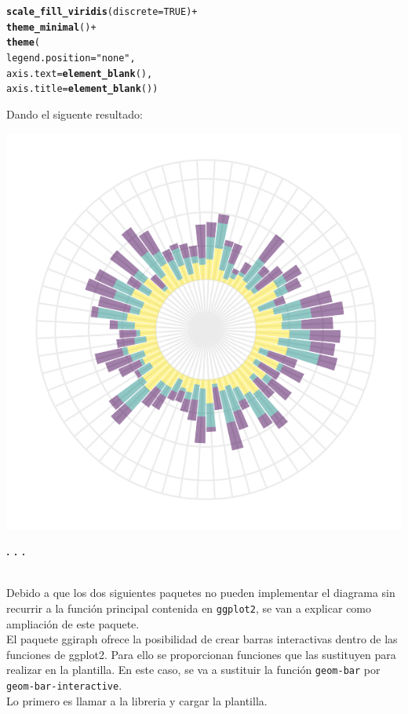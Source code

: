 \documentclass{article}\usepackage[]{graphicx}\usepackage[]{color}
\makeatletter
\def\maxwidth{ %
  \ifdim\Gin@nat@width>\linewidth
    \linewidth
  \else
    \Gin@nat@width
  \fi
}
\newcommand{\hlnum}[1]{\textcolor[rgb]{0.686,0.059,0.569}{#1}}%
\newcommand{\hlstr}[1]{\textcolor[rgb]{0.192,0.494,0.8}{#1}}%
\newcommand{\hlopt}[1]{\textcolor[rgb]{0,0,0}{#1}}%
\newcommand{\hlstd}[1]{\textcolor[rgb]{0.345,0.345,0.345}{#1}}%
\newcommand{\hlkwc}[1]{\textcolor[rgb]{0.333,0.667,0.333}{#1}}%
\newcommand{\hlkwd}[1]{\textcolor[rgb]{0.737,0.353,0.396}{\textbf{#1}}}%
\newenvironment{kframe}{%
 \def\at@end@of@kframe{}%
 \ifinner\ifhmode%
  \def\at@end@of@kframe{\end{minipage}}%
  \begin{minipage}{\columnwidth}%
 \fi\fi%
 \def\FrameCommand##1{\hskip\@totalleftmargin \hskip-\fboxsep
 \colorbox{shadecolor}{##1}\hskip-\fboxsep
     \hskip-\linewidth \hskip-\@totalleftmargin \hskip\columnwidth}%
 \MakeFramed {\advance\hsize-\width
   \@totalleftmargin\z@ \linewidth\hsize
   \@setminipage}}%
 {\par\unskip\endMakeFramed%
 \at@end@of@kframe}
\newenvironment{knitrout}{}{} %
\makeatother
\begin{document}
\begin{knitrout}
\color{fgcolor}\begin{kframe}
\begin{alltt}
  \hlkwd{scale_fill_viridis}\hlstd{(}\hlkwc{discrete}\hlstd{=}\hlnum{TRUE}\hlstd{)} \hlopt{+}
  \hlkwd{theme_minimal}\hlstd{()} \hlopt{+}
  \hlkwd{theme}\hlstd{(}
    \hlkwc{legend.position} \hlstd{=} \hlstr{"none"}\hlstd{,}
    \hlkwc{axis.text} \hlstd{=} \hlkwd{element_blank}\hlstd{(),}
    \hlkwc{axis.title} \hlstd{=} \hlkwd{element_blank}\hlstd{())}
\end{alltt}
\end{kframe}
\end{knitrout}
Dando el siguente resultado:
\begin{knitrout}
\color{fgcolor}

{\centering \includegraphics[width=\maxwidth]{figure/plot_col_sep_gg-1} 

}



\end{knitrout}
\begin{center}
\textbf{. . .}
\end{center}
~\\
Debido a que los dos siguientes paquetes no pueden implementar el diagrama sin recurrir a la funci\'on principal contenida en \texttt{ggplot2}, se van a explicar como ampliaci\'on de este paquete.~\\
El paquete ggiraph \cite{docu_ggiraph}
ofrece la posibilidad de crear barras interactivas dentro de las funciones de ggplot2. Para ello se proporcionan funciones que las sustituyen para realizar en la plantilla. En este caso, se va a sustituir la funci\'on \texttt{geom-bar} por \texttt{geom-bar-interactive}.~\\
Lo primero es llamar a la libreria y cargar la plantilla.
\end{document}
